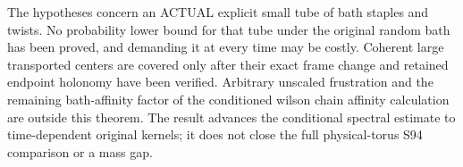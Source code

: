 \documentclass[11pt]{article}
\begin{document}
The hypotheses concern an ACTUAL explicit small tube of bath staples and twists.
No probability lower bound for that tube under the original random bath has
been proved, and demanding it at every time may be costly. Coherent large
transported centers are covered only after their exact frame change and retained
endpoint holonomy have been verified. Arbitrary unscaled frustration and the
remaining bath-affinity factor of the conditioned wilson chain affinity calculation are outside this theorem. The result
advances the conditional spectral estimate to time-dependent original kernels;
it does not close the full physical-torus S94 comparison or a mass gap.
\end{document}
